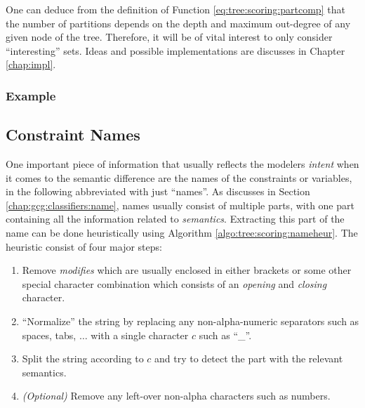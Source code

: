 		One can deduce from the definition of Function \ref{eq:tree:scoring:partcomp} that the number of partitions depends on the depth and maximum out-degree of any given node of the tree.
		Therefore, it will be of vital interest to only consider \enquote{interesting} sets.
		Ideas and possible implementations are discusses in Chapter \ref{chap:impl}.
		
		\clearpage
		
		\subsubsection{Example}
		
		
		\clearpage
	
		\subsection{Constraint Names}
		\label{chap:tree:scoring:names}
		
			One important piece of information that usually reflects the modelers \textit{intent} when it comes to the semantic difference are the names of the constraints or variables, in the following abbreviated with just \enquote{names}.
			As discusses in Section \ref{chap:gcg:classifiers:name}, names usually consist of multiple parts, with one part containing all the information related to \textit{semantics}.
			Extracting this part of the name can be done heuristically using Algorithm \ref{algo:tree:scoring:nameheur}.
			The heuristic consist of four major steps:
			\begin{enumerate}
				\item Remove \textit{modifies} which are usually enclosed in either brackets or some other special character combination which consists of an \textit{opening} and \textit{closing} character.
				\item \enquote{Normalize} the string by replacing any non-alpha-numeric separators such as spaces, tabs, $\ldots$ with a single character $c$ such as \enquote{\_}.
				\item Split the string according to $c$ and try to detect the part with the relevant semantics. 
				\item \textit{(Optional)} Remove any left-over non-alpha characters such as numbers.
			\end{enumerate}
			

